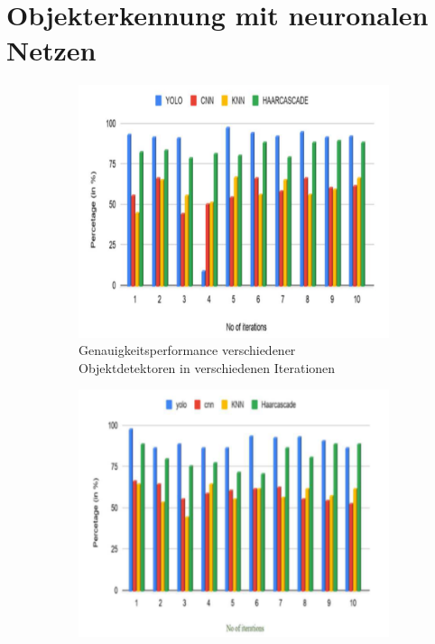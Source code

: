 \chapter{Objekterkennung mit neuronalen Netzen}
\label{ch:Theoretischer Hintergrund}

\begin{figure}[ht]
	\centering
	\begin{subfigure}[b]{0.45\textwidth}
		\centering
		\includegraphics[width=\linewidth]{images/yolo_comp/yolo_acc_perf.png}
		\caption{Genauigkeitsperformance verschiedener Objektdetektoren in verschiedenen Iterationen \cite{Pavani2022}}
		\label{Scr:comp_object_detectorAcc}
	\end{subfigure}
    \hfill
	\begin{subfigure}[b]{0.45\textwidth}
		\centering
		\includegraphics[width=\linewidth]{images/yolo_comp/yolo_prec_perf.png}

\end{subfigure}
\end{figure}
